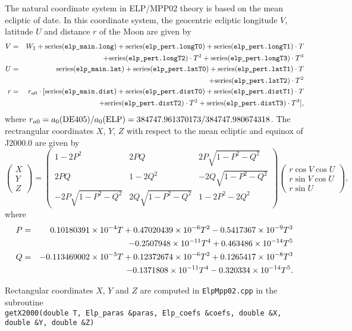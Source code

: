 \documentclass[12pt]{article}
\newcommand \beq {\begin{equation}}
\newcommand \eeq {\end{equation}}
\newcommand \beqn {\begin{eqnarray}}
\newcommand \eeqn {\end{eqnarray}}
\begin{document}
The natural coordinate system in ELP/MPP02 theory is based on the mean ecliptic 
of date. In this coordinate system, the geocentric ecliptic longitude $V$, 
latitude $U$ and distance $r$ of the Moon are given by 
\beqn
  V &=& W_1 + \mbox{series({\tt elp\_main.long})} + \mbox{series({\tt elp\_pert.longT0})} + 
\mbox{series({\tt elp\_pert.longT1})}\cdot T \cr 
&&+ \mbox{series({\tt elp\_pert.longT2})}\cdot T^2 + \mbox{series({\tt elp\_pert.longT3})}\cdot T^3 \\
  U &=& \mbox{series({\tt elp\_main.lat})} + \mbox{series({\tt elp\_pert.latT0})} +
\mbox{series({\tt elp\_pert.latT1})}\cdot T \cr
&&+ \mbox{series({\tt elp\_pert.latT2})}\cdot T^2 \\ 
  r &=& r_{a0} \cdot [\mbox{series({\tt elp\_main.dist})} + \mbox{series({\tt elp\_pert.distT0})} +
\mbox{series({\tt elp\_pert.distT1})}\cdot T \cr
&&+ \mbox{series({\tt elp\_pert.distT2})}\cdot T^2 + \mbox{series({\tt elp\_pert.distT3})}\cdot T^3] ,
\eeqn
where $r_{a0}=a_0({\rm DE405})/a_0({\rm ELP}) = 384747.961370173/384747.980674318$. 
The rectrangular coordinates $X$, $Y$, $Z$ with respect to the mean ecliptic and equinox 
of J2000.0 are given by
\beq
\left( \begin{array}{c} X \\ Y \\ Z\end{array}\right) = 
  \left( \begin{array}{ccc} 
1-2P^2 & 2PQ & 2P\sqrt{1-P^2-Q^2} \\ 
2PQ & 1-2Q^2 & -2Q\sqrt{1-P^2-Q^2} \\ 
-2P\sqrt{1-P^2-Q^2}  & 2Q\sqrt{1-P^2-Q^2} & 1-2P^2-2Q^2 \end{array}\right)
\left( \begin{array}{c} r \cos V \cos U \\ r \sin V \cos U \\ r \sin U \end{array}\right) ,
\eeq
where
\beqn
  P &=& 0.10180391 \times 10^{-4} T + 0.47020439\times 10^{-6} T^2 
- 0.5417367\times 10^{-9} T^3 \cr 
&& - 0.2507948\times 10^{-11} T^4 + 0.463486\times 10^{-14} T^5 \\ 
  Q &=& -0.113469002\times 10^{-3} T + 0.12372674\times 10^{-6} T^2 
+ 0.1265417\times 10^{-8} T^3 \cr 
&& - 0.1371808\times 10^{-11} T^4 - 0.320334\times 10^{-14} T^5 .
\eeqn

Rectangular coordinates $X$, $Y$ and $Z$ are computed in {\tt ElpMpp02.cpp} 
in the subroutine \\
{\tt getX2000(double T,  Elp\_paras \&paras, Elp\_coefs \&coefs,
              double \&X, double \&Y, double \&Z)} 
\end{document}
